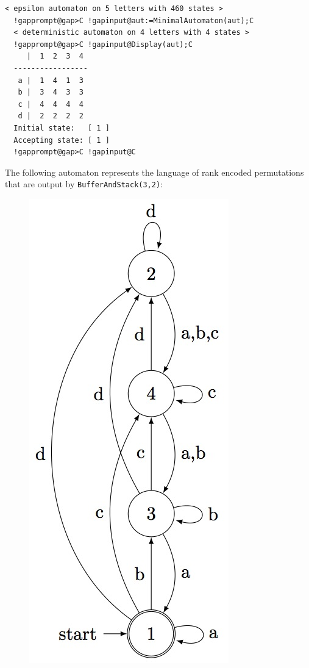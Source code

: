 \documentclass[a4paper,11pt]{report}
\begin{document}
{{{\begin{Verbatim}[commandchars=!@C,fontsize=\small,frame=single,label=Example]
  < epsilon automaton on 5 letters with 460 states >
  !gapprompt@gap>C !gapinput@aut:=MinimalAutomaton(aut);C
  < deterministic automaton on 4 letters with 4 states >
  !gapprompt@gap>C !gapinput@Display(aut);C
     |  1  2  3  4  
  -----------------
   a |  1  4  1  3  
   b |  3  4  3  3  
   c |  4  4  4  4  
   d |  2  2  2  2  
  Initial state:   [ 1 ]
  Accepting state: [ 1 ]
  !gapprompt@gap>C !gapinput@C
\end{Verbatim}
  The following automaton represents the language of rank encoded permutations
that are output by \texttt{BufferAndStack(3,2)}: \begin{figure}[H] \begin{center} \leavevmode
\includegraphics[scale=0.75]{img/bs32aut.jpg} \end{center} \end{figure}   
}}}
\end{document}
